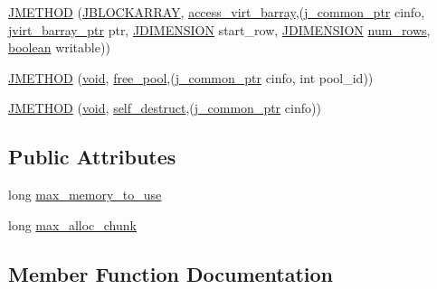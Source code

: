 \begin{DoxyCompactItemize}
\item 
\hyperlink{structjpeg__memory__mgr_aa460f4b500825e051306b8ce5583d052}{J\+M\+E\+T\+H\+O\+D} (\hyperlink{jpeglib_8h_ab03cfeb937b60b9b73ca6e3cf935af49}{J\+B\+L\+O\+C\+K\+A\+R\+R\+A\+Y}, \hyperlink{jmemmgr_8c_a44b7e7df5b22e5aeb267afbd9ee4f37b}{access\+\_\+virt\+\_\+barray},(\hyperlink{jpeglib_8h_a1a177ab705cefea8f30ec31a48e62650}{j\+\_\+common\+\_\+ptr} cinfo, \hyperlink{jpeglib_8h_a994f4cba141d82ded90af38e51223f0b}{jvirt\+\_\+barray\+\_\+ptr} ptr, \hyperlink{jmorecfg_8h_a04ed4674f6f1d0d50ec241531e38274f}{J\+D\+I\+M\+E\+N\+S\+I\+O\+N} start\+\_\+row, \hyperlink{jmorecfg_8h_a04ed4674f6f1d0d50ec241531e38274f}{J\+D\+I\+M\+E\+N\+S\+I\+O\+N} \hyperlink{jpegint_8h_ac5f8b57092da0f421713ba171c4c9f87}{num\+\_\+rows}, \hyperlink{jmorecfg_8h_a7c6368b321bd9acd0149b030bb8275ed}{boolean} writable))
\item 
\hyperlink{structjpeg__memory__mgr_a7e7e063767441999982d22c5cc0e9423}{J\+M\+E\+T\+H\+O\+D} (\hyperlink{png_8h_aa8c59027f9ab2769342f248709d68d17}{void}, \hyperlink{jmemmgr_8c_aafb9808f8c2c22a4115b86a52bcd10fb}{free\+\_\+pool},(\hyperlink{jpeglib_8h_a1a177ab705cefea8f30ec31a48e62650}{j\+\_\+common\+\_\+ptr} cinfo, int pool\+\_\+id))
\item 
\hyperlink{structjpeg__memory__mgr_ae80ddea0ba4f845f91d3a30e350b5f44}{J\+M\+E\+T\+H\+O\+D} (\hyperlink{png_8h_aa8c59027f9ab2769342f248709d68d17}{void}, \hyperlink{jmemmgr_8c_a089178751c0bf3ab81082fcf2a3fab5c}{self\+\_\+destruct},(\hyperlink{jpeglib_8h_a1a177ab705cefea8f30ec31a48e62650}{j\+\_\+common\+\_\+ptr} cinfo))
\end{DoxyCompactItemize}
\subsection*{Public Attributes}
\begin{DoxyCompactItemize}
\item 
long \hyperlink{structjpeg__memory__mgr_aa7ef7c0d7ffbfcbee837ae9cb8b12c7e}{max\+\_\+memory\+\_\+to\+\_\+use}
\item 
long \hyperlink{structjpeg__memory__mgr_a0301712c8796bb5555093d72b37c5a58}{max\+\_\+alloc\+\_\+chunk}
\end{DoxyCompactItemize}


\subsection{Member Function Documentation}
\hypertarget{structjpeg__memory__mgr_a9372ad24444dda23175cc9203105911c}{}
